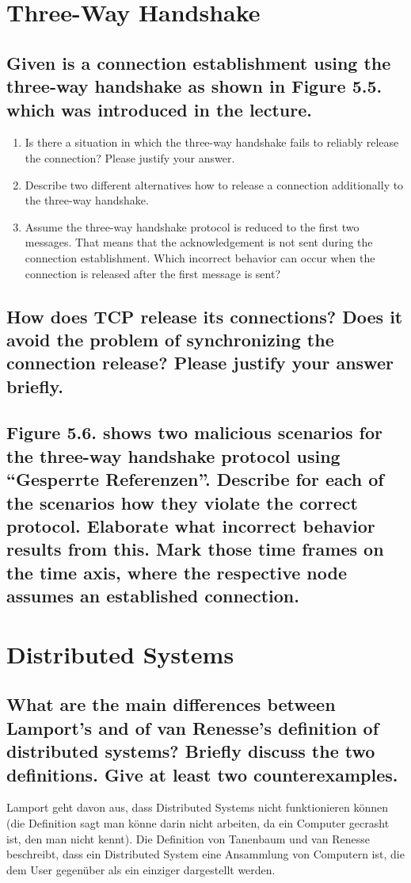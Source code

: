 \documentclass[a4paper,
			llpt,
			solution,
			accentcolor=tud2d,
			colorbacktitle
			]
			{tudexercise}
\begin{document}
\section{Three-Way Handshake}
\subsection{Given is a connection establishment using the three-way handshake as shown in Figure 5.5. which was introduced in the lecture.}
\begin{enumerate}
\item Is there a situation in which the three-way handshake fails to reliably release the connection?
Please justify your answer.
\item Describe two different alternatives how to release a connection additionally to the three-way
handshake.
\item Assume the three-way handshake protocol is reduced to the first two messages. That means
that the acknowledgement is not sent during the connection establishment. Which incorrect
behavior can occur when the connection is released after the first message is sent?
\end{enumerate}
\subsection{How does TCP release its connections? Does it avoid the problem of synchronizing the connection release? Please justify your answer briefly.}
\subsection{Figure 5.6. shows two malicious scenarios for the three-way handshake protocol using “Gesperrte Referenzen”. Describe for each of the scenarios how they violate the correct protocol. Elaborate what incorrect behavior results from this. Mark those time frames on the time axis, where the respective node assumes an established connection.}
\section{Distributed Systems}
\subsection{What are the main differences between Lamport’s and of van Renesse’s definition of distributed systems? Briefly discuss the two definitions. Give at least two counterexamples.}
Lamport geht davon aus, dass Distributed Systems nicht funktionieren können (die Definition sagt man könne darin nicht arbeiten, da ein Computer gecrasht ist, den man nicht kennt). Die Definition von Tanenbaum und van Renesse beschreibt, dass ein Distributed System eine Ansammlung von Computern ist, die dem User gegenüber als ein einziger dargestellt werden.
\end{document}
